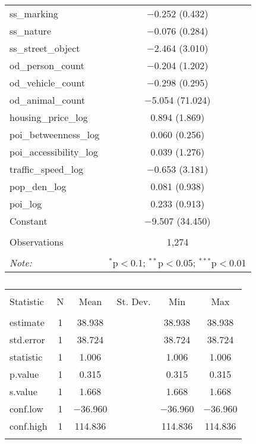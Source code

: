 \begin{table}[!htbp]
\begin{tabular}{@{\extracolsep{1pt}}lc}
  ss\_marking & $-$0.252 (0.432) \\ 
  ss\_nature & $-$0.076 (0.284) \\ 
  ss\_street\_object & $-$2.464 (3.010) \\ 
  od\_person\_count & $-$0.204 (1.202) \\ 
  od\_vehicle\_count & $-$0.298 (0.295) \\ 
  od\_animal\_count & $-$5.054 (71.024) \\ 
  housing\_price\_log & 0.894 (1.869) \\ 
  poi\_betweenness\_log & 0.060 (0.256) \\ 
  poi\_accessibility\_log & 0.039 (1.276) \\ 
  traffic\_speed\_log & $-$0.653 (3.181) \\ 
  pop\_den\_log & 0.081 (0.938) \\ 
  poi\_log & 0.233 (0.913) \\ 
  Constant & $-$9.507 (34.450) \\ 
 \hline \\[-1.8ex] 
Observations & 1,274 \\ 
\hline 
\hline \\[-1.8ex] 
\textit{Note:}  & \multicolumn{1}{r}{$^{*}$p$<$0.1; $^{**}$p$<$0.05; $^{***}$p$<$0.01} \\ 
\end{tabular} 
\end{table} 

\begin{table}[!htbp] \centering 
  \caption{} 
  \label{} 
\small 
\begin{tabular}{@{\extracolsep{1pt}}lccccc} 
\\[-1.8ex]\hline 
\hline \\[-1.8ex] 
Statistic & \multicolumn{1}{c}{N} & \multicolumn{1}{c}{Mean} & \multicolumn{1}{c}{St. Dev.} & \multicolumn{1}{c}{Min} & \multicolumn{1}{c}{Max} \\ 
\hline \\[-1.8ex] 
estimate & 1 & 38.938 &  & 38.938 & 38.938 \\ 
std.error & 1 & 38.724 &  & 38.724 & 38.724 \\ 
statistic & 1 & 1.006 &  & 1.006 & 1.006 \\ 
p.value & 1 & 0.315 &  & 0.315 & 0.315 \\ 
s.value & 1 & 1.668 &  & 1.668 & 1.668 \\ 
conf.low & 1 & $-$36.960 &  & $-$36.960 & $-$36.960 \\ 
conf.high & 1 & 114.836 &  & 114.836 & 114.836 \\ 
\hline \\[-1.8ex] 
\end{tabular} 
\end{table} 

